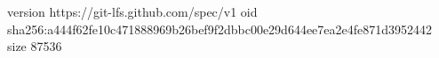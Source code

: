 version https://git-lfs.github.com/spec/v1
oid sha256:a444f62fe10c471888969b26bef9f2dbbc00e29d644ee7ea2e4fe871d3952442
size 87536
